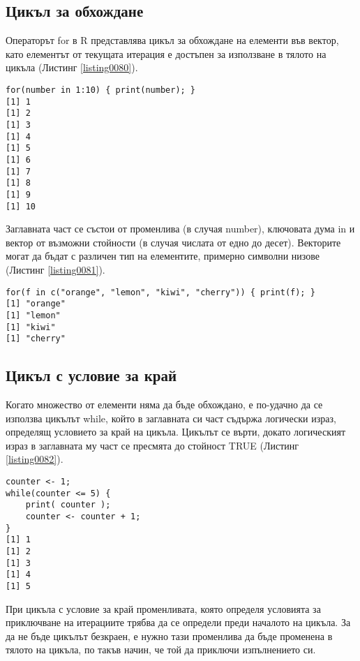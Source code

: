 \subsection{Цикъл за обхождане}

Операторът for в R представлява цикъл за обхождане на елементи във вектор, като елементът от текущата итерация е достъпен за използване в тялото на цикъла (Листинг \ref{listing0080}).

\begin{lstlisting}[caption=Оператор за цикъл for, label=listing0080]
for(number in 1:10) { print(number); }
[1] 1
[1] 2
[1] 3
[1] 4
[1] 5
[1] 6
[1] 7
[1] 8
[1] 9
[1] 10
\end{lstlisting}

Заглавната част се състои от променлива (в случая number), ключовата дума in и вектор от възможни стойности (в случая числата от едно до десет). Векторите могат да бъдат с различен тип на елементите, примерно символни низове (Листинг \ref{listing0081}).

\begin{lstlisting}[caption=Обхождане на вектор от символни низове, label=listing0081]
for(f in c("orange", "lemon", "kiwi", "cherry")) { print(f); }
[1] "orange"
[1] "lemon"
[1] "kiwi"
[1] "cherry"
\end{lstlisting}

\subsection{Цикъл с условие за край}

Когато множество от елементи няма да бъде обхождано, е по-удачно да се използва цикълът while, който в заглавната си част съдържа логически израз, определящ условието за край на цикъла. Цикълът се върти, докато логическият израз в заглавната му част се пресмята до стойност TRUE (Листинг \ref{listing0082}).

\begin{lstlisting}[caption=Цикъл с условие за край, label=listing0082]
counter <- 1;
while(counter <= 5) { 
	print( counter ); 
	counter <- counter + 1;
}
[1] 1
[1] 2
[1] 3
[1] 4
[1] 5
\end{lstlisting}

При цикъла с условие за край променливата, която определя условията за приключване на итерациите трябва да се определи преди началото на цикъла. За да не бъде цикълът безкраен, е нужно тази променлива да бъде променена в тялото на цикъла, по такъв начин, че той да приключи изпълнението си.

